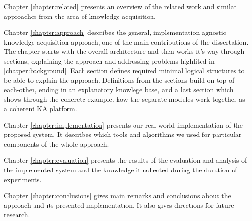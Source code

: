 Chapter \ref{chapter:related} presents an overview of the related work and
similar approaches from the area of knowledge acquisition.

Chapter \ref{chapter:approach} describes the general, implementation agnostic
knowledge acquisition approach, one of the main contributions of the dissertation.
The chapter starts with the overall architecture and then works it's way through
sections, explaining the approach and addressing problems highlited in
\autoref{chatper:background}. Each section defines required minimal logical
structures to be able to explain the approach. Definitions from the sections
build on top of each-other, ending in an explanatory knowlege base, and
a last section which shows through the concrete example, how the separate 
modules work together as a coherent KA platform.

Chapter \ref{chapter:implementation} presents our real world implementation of 
the proposed system. It describes which tools and algorithms we used for 
particular components of the whole approach.

Chapter \ref{chapter:evaluation} presents the results of the evaluation and
analysis of the implemented system and the knowledge it collected during the
duration of experiments.

Chapter \ref{chapter:conclusions} gives main remarks and conclusions about the
approach and its presented implementation. It also gives directions for future
research.
